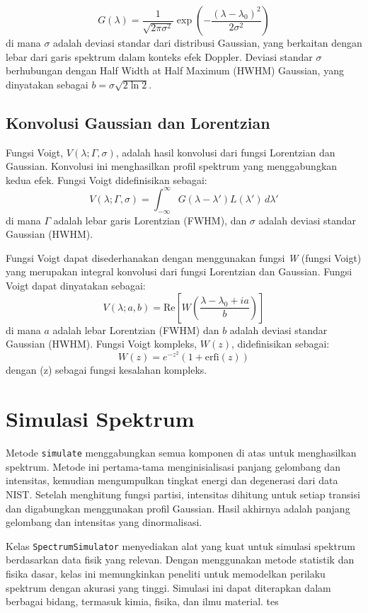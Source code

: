 \begin{equation}
G(\lambda) = \frac{1}{\sqrt{2\pi \sigma^2}} \exp\left(-\frac{(\lambda - \lambda_0)^2}{2\sigma^2}\right)
\end{equation}
di mana \( \sigma \) adalah deviasi standar dari distribusi Gaussian, yang berkaitan dengan lebar dari garis spektrum dalam konteks efek Doppler. Deviasi standar \( \sigma \) berhubungan dengan Half Width at Half Maximum (HWHM) Gaussian, yang dinyatakan sebagai \( b = \sigma \sqrt{2 \ln 2} \).

\subsection{Konvolusi Gaussian dan Lorentzian}
\par Fungsi Voigt, \( V(\lambda; \Gamma, \sigma) \), adalah hasil konvolusi dari fungsi Lorentzian dan Gaussian. Konvolusi ini menghasilkan profil spektrum yang menggabungkan kedua efek. Fungsi Voigt didefinisikan sebagai:
\begin{equation}
V(\lambda; \Gamma, \sigma) = \int_{-\infty}^{\infty} G(\lambda - \lambda') L(\lambda') \, d\lambda'
\end{equation}
di mana \( \Gamma \) adalah lebar garis Lorentzian (FWHM), dan \( \sigma \) adalah deviasi standar Gaussian (HWHM).

\par Fungsi Voigt dapat disederhanakan dengan menggunakan fungsi \textit{W} (fungsi Voigt) yang merupakan integral konvolusi dari fungsi Lorentzian dan Gaussian. Fungsi Voigt dapat dinyatakan sebagai: %
\begin{equation}
V(\lambda; a, b) = \text{Re} \left[ W\left(\frac{\lambda - \lambda_0 + i a}{b}\right) \right]
\end{equation}
di mana \( a \) adalah lebar Lorentzian (FWHM) dan \( b \) adalah deviasi standar Gaussian (HWHM). Fungsi Voigt kompleks, \( W(z) \), didefinisikan sebagai:
\begin{equation}
W(z) = e^{-z^2} \left( 1 + \text{erfi}(z) \right)
\end{equation}
dengan (z) sebagai fungsi kesalahan kompleks.

\section{Simulasi Spektrum}
\par Metode \texttt{simulate} menggabungkan semua komponen di atas untuk menghasilkan spektrum. Metode ini pertama-tama menginisialisasi panjang gelombang dan intensitas, kemudian mengumpulkan tingkat energi dan degenerasi dari data NIST. Setelah menghitung fungsi partisi, intensitas dihitung untuk setiap transisi dan digabungkan menggunakan profil Gaussian. Hasil akhirnya adalah panjang gelombang dan intensitas yang dinormalisasi.

\par Kelas \texttt{SpectrumSimulator} menyediakan alat yang kuat untuk simulasi spektrum berdasarkan data fisik yang relevan. Dengan menggunakan metode statistik dan fisika dasar, kelas ini memungkinkan peneliti untuk memodelkan perilaku spektrum dengan akurasi yang tinggi. Simulasi ini dapat diterapkan dalam berbagai bidang, termasuk kimia, fisika, dan ilmu material. tes
